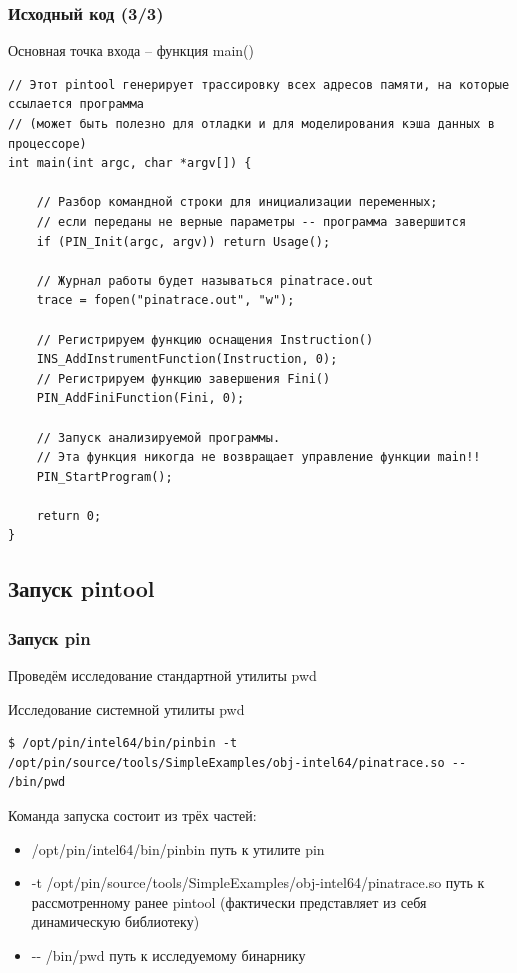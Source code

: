 \documentclass{beamer}
\begin{document}
\begin{frame}[fragile] %
\frametitle{Исходный код (3/3)}
\begin{block}{Основная точка входа -- функция main()}
\begin{verbatim}
// Этот pintool генерирует трассировку всех адресов памяти, на которые ссылается программа
// (может быть полезно для отладки и для моделирования кэша данных в процессоре)
int main(int argc, char *argv[]) {

    // Разбор командной строки для инициализации переменных;
    // если переданы не верные параметры -- программа завершится
    if (PIN_Init(argc, argv)) return Usage();

    // Журнал работы будет называться pinatrace.out
    trace = fopen("pinatrace.out", "w");

    // Регистрируем функцию оснащения Instruction()
    INS_AddInstrumentFunction(Instruction, 0);
    // Регистрируем функцию завершения Fini()
    PIN_AddFiniFunction(Fini, 0);

    // Запуск анализируемой программы.
    // Эта функция никогда не возвращает управление функции main!!
    PIN_StartProgram();
    
    return 0;
}
\end{verbatim}
\end{block}
\end{frame}

\subsection{Запуск pintool}

\begin{frame}[fragile] %
\frametitle{Запуск pin}

Проведём исследование стандартной утилиты pwd

\begin{block}{Исследование системной утилиты pwd}
\begin{verbatim}
$ /opt/pin/intel64/bin/pinbin -t /opt/pin/source/tools/SimpleExamples/obj-intel64/pinatrace.so -- /bin/pwd
\end{verbatim}
\end{block}

Команда запуска состоит из трёх частей:
\begin{itemize}
\item /opt/pin/intel64/bin/pinbin путь к утилите pin
\item -t /opt/pin/source/tools/SimpleExamples/obj-intel64/pinatrace.so путь к рассмотренному ранее pintool (фактически представляет из себя динамическую библиотеку)
\item -{}- /bin/pwd путь к исследуемому бинарнику
\end{itemize}

\end{frame}
\end{document}
